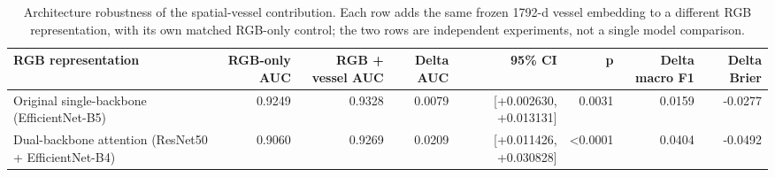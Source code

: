 \begin{table}[htbp]
\centering
\small
\caption{Architecture robustness of the spatial-vessel contribution. Each row adds the same frozen 1792-d vessel embedding to a different RGB representation, with its own matched RGB-only control; the two rows are independent experiments, not a single model comparison.}
\label{tab:archrobust}
\begin{tabular}{p{5.6cm}rrrrrrr}
\toprule
RGB representation & RGB-only AUC & RGB + vessel AUC & Delta AUC & 95\% CI & p & Delta macro F1 & Delta Brier \\
\midrule
Original single-backbone (EfficientNet-B5) & 0.9249 & 0.9328 & 0.0079 & [+0.002630, +0.013131] & 0.0031 & 0.0159 & -0.0277 \\
Dual-backbone attention (ResNet50 + EfficientNet-B4) & 0.9060 & 0.9269 & 0.0209 & [+0.011426, +0.030828] & <0.0001 & 0.0404 & -0.0492 \\
\bottomrule
\end{tabular}
\end{table}
